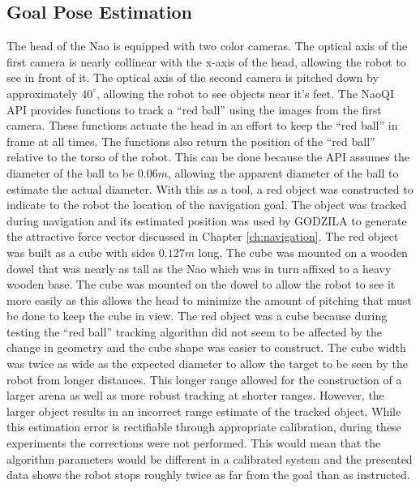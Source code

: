 \subsection{Goal Pose Estimation} \label{subsec:goal_pose_est}
The head of the Nao is equipped with two color cameras. The optical axis of the
first camera is nearly collinear with the x-axis of the head, allowing the
robot to see in front of it. The optical axis of the second camera is pitched
down by approximately $40^\circ$, allowing the robot to see objects near it's feet.
The NaoQI API provides functions to track a ``red ball'' using the images from the first camera. 
These functions actuate the head in an effort to keep the ``red ball'' in frame at all times.
The functions also return the position of the ``red ball'' relative to the torso of the robot.
This can be done because the API assumes the diameter of the ball to be $0.06 m$, allowing
the apparent diameter of the ball to estimate the actual diameter.
With this as a tool, a red object was constructed to indicate to the robot the location of the
navigation goal. The object was tracked during navigation and its estimated position was used
by GODZILA to generate the attractive force vector discussed in Chapter \ref{ch:navigation}.
The red object was built as a cube with sides $0.127 m$ long. The cube was
mounted on a wooden dowel that was nearly as tall as the Nao which was in turn
affixed to a heavy wooden base.
The cube was mounted on the dowel to allow the robot to see it more easily as this
allows the head to minimize the amount of pitching that must be done to keep the cube in view.
The red object was a cube because during testing the ``red ball'' tracking algorithm did not
seem to be affected by the change in geometry and the cube shape was easier to construct.
The cube width was twice as wide as the expected diameter to allow the target to be seen 
by the robot from longer distances. This longer range allowed for the construction of
a larger arena as well as more robust tracking at shorter ranges.
However, the larger object results in an incorrect range estimate of the tracked object.
While this estimation error is rectifiable through appropriate calibration,
during these experiments the corrections were not performed.
This would mean that the algorithm parameters would be different in a calibrated system
and the presented data shows the robot stops roughly twice as far from the goal than as
instructed.

